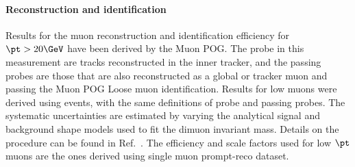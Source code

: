 \paragraph*{Reconstruction and identification}

Results for the muon reconstruction and identification efficiency for $\pt > 20\GeV$
have been derived by the Muon POG.
The probe in this measurement are tracks reconstructed in the inner tracker, and
the passing probes are those that are also reconstructed as a global or tracker muon 
and passing the Muon POG Loose muon identification.
%
Results for low \pt muons were derived using \JPsi events, with the same definitions
of probe and passing probes. The systematic uncertainties are estimated by varying the analytical signal and background shape models used to fit 
the dimuon invariant mass. Details on the procedure can be found in Ref.~\cite{AN-15-277}. The efficiency and scale 
factors used for low $\pt$ muons are the ones derived using single muon prompt-reco dataset.

